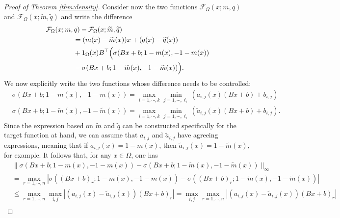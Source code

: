 \documentclass[10pt,a4paper]{amsart}
\newcommand{\R}{\mathbb{R}}
\begin{document}
\begin{proof}[Proof of Theorem \ref{thm:density}]
Consider now the two functions $\mathcal{F}_{\Omega}(x;m,q)$ and $\mathcal{F}_{\Omega}(x;\widetilde{m},\widetilde{q})$
and write the difference
\[
\begin{split}
&\mathcal{F}_{\Omega}(x;m,q)-\mathcal{F}_\Omega(x;\widetilde{m},\widetilde{q})\\
& \qquad \qquad = (m(x)-\widetilde{m}(x))x + (q(x)-\widetilde{q}(x))\\
& \qquad \qquad +1_{\Omega}(x)B^\top\Bigl(\sigma(Bx+b;1-m(x),-1-m(x))\\
& \qquad \qquad - \sigma(Bx+b;1-\widetilde{m}(x),-1-\widetilde{m}(x))\Bigr).
\end{split}
\]
We now explicitly write the two functions whose difference needs to be controlled:
\[
\begin{split}
& \sigma(Bx+b;1-m(x),-1-m(x))= \max_{i=1,\cdots,k}\min_{j=1,\cdots,\ell_i}(a_{i,j}(x)(Bx+b) + b_{i,j}) \\
&\sigma(Bx+b;1-\widetilde{m}(x),-1-\widetilde{m}(x)) = \max_{i=1,\cdots,k}\min_{j=1,\cdots,\ell_i}(\widetilde{a}_{i,j}(x)(Bx+b) + {b}_{i,j}).
\end{split}
\]
Since the expression based on $\widetilde{m}$ and $\widetilde{q}$ can be constructed specifically for the target function at hand, we can assume that $a_{i,j}$ and $\widetilde{a}_{i,j}$ have agreeing expressions, meaning that if $a_{i,j}(x)=1-m(x)$, then $\widetilde{a}_{i,j}(x)=1-\widetilde{m}(x)$, for example. It follows that, for any $x\in\Omega$, one has
\[
\begin{split}
&\|\sigma(Bx+b;1-m(x),-1-m(x))-\sigma(Bx+b;1-\widetilde{m}(x),-1-\widetilde{m}(x))\|_\infty\\
&=\max_{r=1,\cdots,n} |\sigma((Bx+b)_r;1-m(x),-1-m(x))-\sigma((Bx+b)_r;1-\widetilde{m}(x),-1-\widetilde{m}(x))| \\
&\leq \max_{r=1,\cdots,n} \max_{i,j}|(a_{i,j}(x)-\widetilde{a}_{i,j}(x))(Bx+b)_r| = \max_{i,j} \max_{r=1,\cdots,n} |(a_{i,j}(x)-\widetilde{a}_{i,j}(x))(Bx+b)_r|\\

\end{split}\]
\end{proof}
\end{document}
